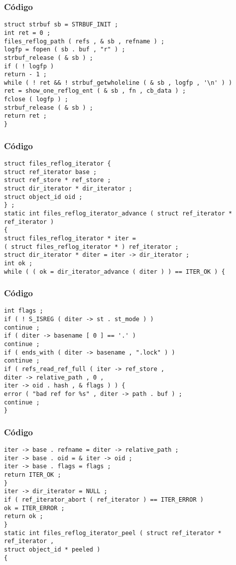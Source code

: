 \documentclass{beamer}
\begin{document}
\begin{frame}[fragile]
\frametitle{C\'odigo}
\begin{verbatim}
struct strbuf sb = STRBUF_INIT ; 
int ret = 0 ; 
files_reflog_path ( refs , & sb , refname ) ; 
logfp = fopen ( sb . buf , "r" ) ; 
strbuf_release ( & sb ) ; 
if ( ! logfp ) 
return - 1 ; 
while ( ! ret && ! strbuf_getwholeline ( & sb , logfp , '\n' ) ) 
ret = show_one_reflog_ent ( & sb , fn , cb_data ) ; 
fclose ( logfp ) ; 
strbuf_release ( & sb ) ; 
return ret ; 
} 
\end{verbatim}
\end{frame}
\begin{frame}[fragile]
\frametitle{C\'odigo}
\begin{verbatim}
struct files_reflog_iterator { 
struct ref_iterator base ; 
struct ref_store * ref_store ; 
struct dir_iterator * dir_iterator ; 
struct object_id oid ; 
} ; 
static int files_reflog_iterator_advance ( struct ref_iterator * ref_iterator ) 
{ 
struct files_reflog_iterator * iter = 
( struct files_reflog_iterator * ) ref_iterator ; 
struct dir_iterator * diter = iter -> dir_iterator ; 
int ok ; 
while ( ( ok = dir_iterator_advance ( diter ) ) == ITER_OK ) { 
\end{verbatim}
\end{frame}
\begin{frame}[fragile]
\frametitle{C\'odigo}
\begin{verbatim}
int flags ; 
if ( ! S_ISREG ( diter -> st . st_mode ) ) 
continue ; 
if ( diter -> basename [ 0 ] == '.' ) 
continue ; 
if ( ends_with ( diter -> basename , ".lock" ) ) 
continue ; 
if ( refs_read_ref_full ( iter -> ref_store , 
diter -> relative_path , 0 , 
iter -> oid . hash , & flags ) ) { 
error ( "bad ref for %s" , diter -> path . buf ) ; 
continue ; 
} 
\end{verbatim}
\end{frame}
\begin{frame}[fragile]
\frametitle{C\'odigo}
\begin{verbatim}
iter -> base . refname = diter -> relative_path ; 
iter -> base . oid = & iter -> oid ; 
iter -> base . flags = flags ; 
return ITER_OK ; 
} 
iter -> dir_iterator = NULL ; 
if ( ref_iterator_abort ( ref_iterator ) == ITER_ERROR ) 
ok = ITER_ERROR ; 
return ok ; 
} 
static int files_reflog_iterator_peel ( struct ref_iterator * ref_iterator , 
struct object_id * peeled ) 
{ 
\end{verbatim}
\end{frame}
\end{document}
